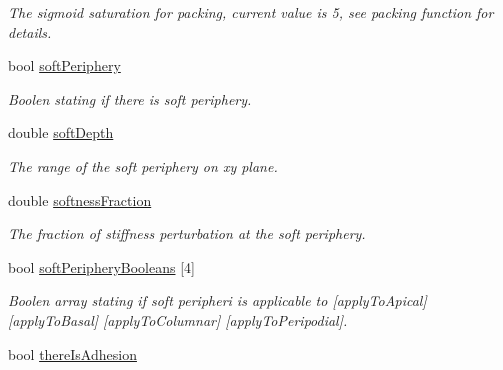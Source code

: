 \begin{DoxyCompactItemize}
\begin{DoxyCompactList}\small\item\em The sigmoid saturation for packing, current value is 5, see packing function for details. \end{DoxyCompactList}\item 
\hypertarget{classSimulation_af0e6096603f734ee31fbd898f94bf38b}{}bool \hyperlink{classSimulation_af0e6096603f734ee31fbd898f94bf38b}{soft\+Periphery}\label{classSimulation_af0e6096603f734ee31fbd898f94bf38b}

\begin{DoxyCompactList}\small\item\em Boolen stating if there is soft periphery. \end{DoxyCompactList}\item 
\hypertarget{classSimulation_ab8301fb9927cb0527b8f58129aca5626}{}double \hyperlink{classSimulation_ab8301fb9927cb0527b8f58129aca5626}{soft\+Depth}\label{classSimulation_ab8301fb9927cb0527b8f58129aca5626}

\begin{DoxyCompactList}\small\item\em The range of the soft periphery on xy plane. \end{DoxyCompactList}\item 
\hypertarget{classSimulation_a13ef7df1104c1e1263f50f11f36f3cdf}{}double \hyperlink{classSimulation_a13ef7df1104c1e1263f50f11f36f3cdf}{softness\+Fraction}\label{classSimulation_a13ef7df1104c1e1263f50f11f36f3cdf}

\begin{DoxyCompactList}\small\item\em The fraction of stiffness perturbation at the soft periphery. \end{DoxyCompactList}\item 
\hypertarget{classSimulation_a939ae561258603220a73e00ad4143def}{}bool \hyperlink{classSimulation_a939ae561258603220a73e00ad4143def}{soft\+Periphery\+Booleans} \mbox{[}4\mbox{]}\label{classSimulation_a939ae561258603220a73e00ad4143def}

\begin{DoxyCompactList}\small\item\em Boolen array stating if soft peripheri is applicable to \mbox{[}apply\+To\+Apical\mbox{]} \mbox{[}apply\+To\+Basal\mbox{]} \mbox{[}apply\+To\+Columnar\mbox{]} \mbox{[}apply\+To\+Peripodial\mbox{]}. \end{DoxyCompactList}\item 
\hypertarget{classSimulation_a193d6b133b6b3cc3ad199dde1420756d}{}bool \hyperlink{classSimulation_a193d6b133b6b3cc3ad199dde1420756d}{there\+Is\+Adhesion}\label{classSimulation_a193d6b133b6b3cc3ad199dde1420756d}


\end{DoxyCompactItemize}

